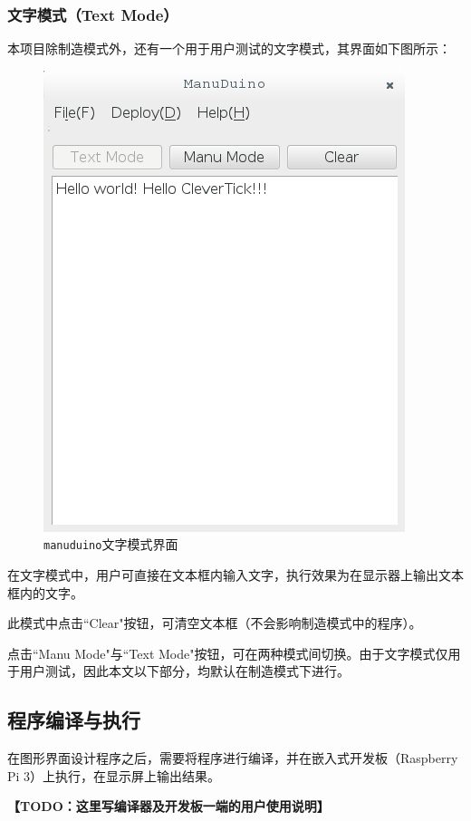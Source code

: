 \documentclass[UTF8]{ctexart}
\begin{document}
\subsubsection{文字模式（Text Mode）}
本项目除制造模式外，还有一个用于用户测试的文字模式，其界面如下图所示：\par
\begin{figure}[htb]
	\centering \includegraphics[scale=0.75]{2.png} \par
	\caption{\texttt{manuduino}文字模式界面}
\end{figure}
在文字模式中，用户可直接在文本框内输入文字，执行效果为在显示器上输出文本框内的文字。\par
此模式中点击``Clear"按钮，可清空文本框（不会影响制造模式中的程序）。\par
点击``Manu Mode"与``Text Mode"按钮，可在两种模式间切换。由于文字模式仅用于用户测试，因此本文以下部分，均默认在制造模式下进行。\par

\subsection{程序编译与执行}
在图形界面设计程序之后，需要将程序进行编译，并在嵌入式开发板（Raspberry Pi 3）上执行，在显示屏上输出结果。\par
\textbf{\Large 【TODO：这里写编译器及开发板一端的用户使用说明】} \par
\end{document}
